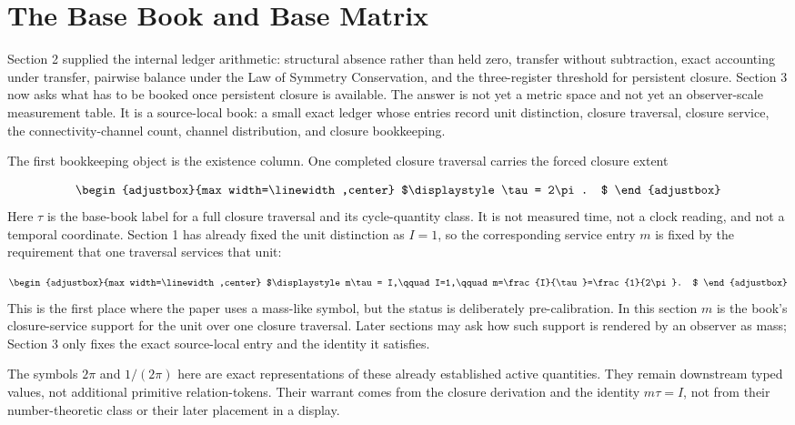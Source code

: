 \section{The Base Book and Base Matrix}
\label{sec:03}
Section 2 supplied the internal ledger arithmetic: structural absence rather than held zero, transfer without subtraction, exact accounting under transfer, pairwise balance under the Law of Symmetry Conservation, and the three-register threshold for persistent closure. Section 3 now asks what has to be booked once persistent closure is available. The answer is not yet a metric space and not yet an observer-scale measurement table. It is a source-local book: a small exact ledger whose entries record unit distinction, closure traversal, closure service, the connectivity-channel count, channel distribution, and closure bookkeeping.

The first bookkeeping object is the existence column. One completed closure traversal carries the forced closure extent

\begin{equation*}
\begin{adjustbox}{max width=\linewidth,center}
$\displaystyle
\tau = 2\pi .
$
\end{adjustbox}
\end{equation*}
Here \(\tau\) is the base-book label for a full closure traversal and its cycle-quantity class. It is not measured time, not a clock reading, and not a temporal coordinate. Section 1 has already fixed the unit distinction as \(I=1\), so the corresponding service entry \(m\) is fixed by the requirement that one traversal services that unit:

\begin{equation*}
\begin{adjustbox}{max width=\linewidth,center}
$\displaystyle
m\tau = I,\qquad I=1,\qquad
m=\frac{I}{\tau}=\frac{1}{2\pi}.
$
\end{adjustbox}
\end{equation*}
This is the first place where the paper uses a mass-like symbol, but the status is deliberately pre-calibration. In this section \(m\) is the book's closure-service support for the unit over one closure traversal. Later sections may ask how such support is rendered by an observer as mass; Section 3 only fixes the exact source-local entry and the identity it satisfies.

The symbols \(2\pi\) and \(1/(2\pi)\) here are exact representations of these already established active quantities. They remain downstream typed values, not additional primitive relation-tokens. Their warrant comes from the closure derivation and the identity \(m\tau=I\), not from their number-theoretic class or their later placement in a display.

